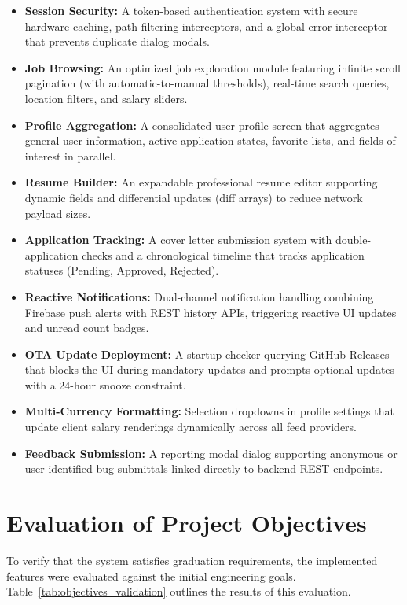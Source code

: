 \begin{itemize}
    \item \textbf{Session Security:} A token-based authentication system with secure hardware caching, path-filtering interceptors, and a global error interceptor that prevents duplicate dialog modals.
    \item \textbf{Job Browsing:} An optimized job exploration module featuring infinite scroll pagination (with automatic-to-manual thresholds), real-time search queries, location filters, and salary sliders.
    \item \textbf{Profile Aggregation:} A consolidated user profile screen that aggregates general user information, active application states, favorite lists, and fields of interest in parallel.
    \item \textbf{Resume Builder:} An expandable professional resume editor supporting dynamic fields and differential updates (diff arrays) to reduce network payload sizes.
    \item \textbf{Application Tracking:} A cover letter submission system with double-application checks and a chronological timeline that tracks application statuses (Pending, Approved, Rejected).
    \item \textbf{Reactive Notifications:} Dual-channel notification handling combining Firebase push alerts with REST history APIs, triggering reactive UI updates and unread count badges.
    \item \textbf{OTA Update Deployment:} A startup checker querying GitHub Releases that blocks the UI during mandatory updates and prompts optional updates with a 24-hour snooze constraint.
    \item \textbf{Multi-Currency Formatting:} Selection dropdowns in profile settings that update client salary renderings dynamically across all feed providers.
    \item \textbf{Feedback Submission:} A reporting modal dialog supporting anonymous or user-identified bug submittals linked directly to backend REST endpoints.
\end{itemize}

\section{Evaluation of Project Objectives}
To verify that the system satisfies graduation requirements, the implemented features were evaluated against the initial engineering goals. Table~\ref{tab:objectives_validation} outlines the results of this evaluation.


